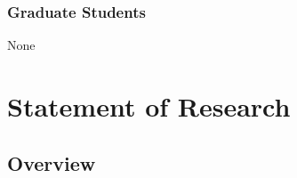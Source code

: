 \documentclass[10pt]{article}
\renewcommand{\baselinestretch}{1.1}
\begin{document}
\subsubsection*{Graduate Students}

None

\eject




\setlength{\oddsidemargin}{0pt}
\setlength{\evensidemargin}{0pt}
\setlength{\marginparwidth}{0pt}
\setlength{\textwidth}{7.5in}
\setlength{\marginparsep}{0pt}
 \fancyfootoffset{-0.5in}

\renewcommand{\baselinestretch}{1.0}
\setlength{\parskip}{0.25em}

\section*{Statement of Research}

\subsection*{Overview}
\end{document}
